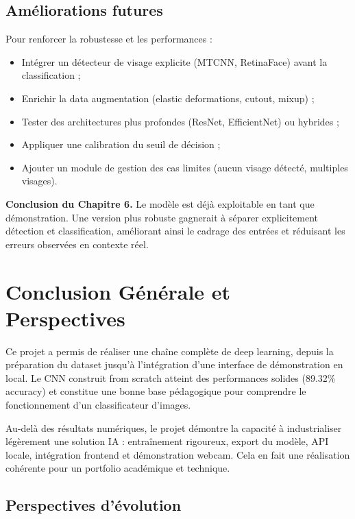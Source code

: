 \documentclass[11pt,a4paper]{article}
\begin{document}
\subsection{Améliorations futures}

Pour renforcer la robustesse et les performances :
\begin{itemize}
    \item Intégrer un détecteur de visage explicite (MTCNN, RetinaFace) avant la classification ;
    \item Enrichir la data augmentation (elastic deformations, cutout, mixup) ;
    \item Tester des architectures plus profondes (ResNet, EfficientNet) ou hybrides ;
    \item Appliquer une calibration du seuil de décision ;
    \item Ajouter un module de gestion des cas limites (aucun visage détecté, multiples visages).
\end{itemize}

\textbf{Conclusion du Chapitre 6.} Le modèle est déjà exploitable en tant que démonstration. Une version plus robuste gagnerait à séparer explicitement détection et classification, améliorant ainsi le cadrage des entrées et réduisant les erreurs observées en contexte réel.

\newpage
\section*{Conclusion Générale et Perspectives}

Ce projet a permis de réaliser une chaîne complète de deep learning, depuis la préparation du dataset jusqu'à l'intégration d'une interface de démonstration en local. Le CNN construit from scratch atteint des performances solides (89.32\% accuracy) et constitue une bonne base pédagogique pour comprendre le fonctionnement d'un classificateur d'images.

Au-delà des résultats numériques, le projet démontre la capacité à industrialiser légèrement une solution IA : entraînement rigoureux, export du modèle, API locale, intégration frontend et démonstration webcam. Cela en fait une réalisation cohérente pour un portfolio académique et technique.

\subsection*{Perspectives d'évolution}
\end{document}
